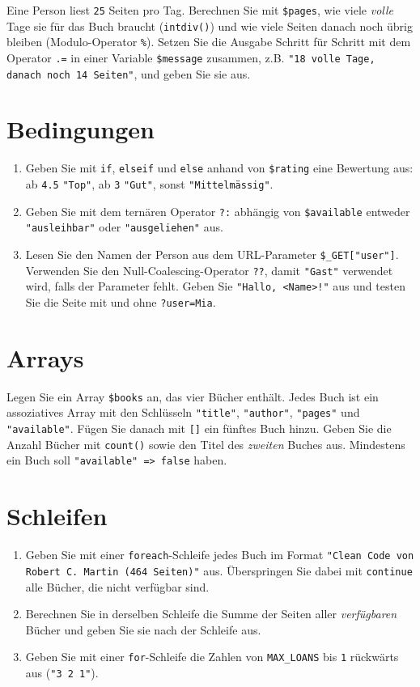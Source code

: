 \documentclass[a4paper,12pt]{article}
\begin{document}
Eine Person liest \texttt{25} Seiten pro Tag. Berechnen Sie mit \texttt{\$pages}, wie viele \emph{volle} Tage sie für das Buch braucht (\texttt{intdiv()}) und wie viele Seiten danach noch übrig bleiben (Modulo-Operator \texttt{\%}). Setzen Sie die Ausgabe Schritt für Schritt mit dem Operator \texttt{.=} in einer Variable \texttt{\$message} zusammen, z.B. \texttt{"{}18 volle Tage, danach noch 14 Seiten"{}}, und geben Sie sie aus.

\section{Bedingungen}

\begin{enumerate}
    \item Geben Sie mit \texttt{if}, \texttt{elseif} und \texttt{else} anhand von \texttt{\$rating} eine Bewertung aus: ab \texttt{4.5} \texttt{"{}Top"{}}, ab \texttt{3} \texttt{"{}Gut"{}}, sonst \texttt{"{}Mittelmässig"{}}.
    \item Geben Sie mit dem ternären Operator \texttt{?:} abhängig von \texttt{\$available} entweder \texttt{"{}ausleihbar"{}} oder \texttt{"{}ausgeliehen"{}} aus.
    \item Lesen Sie den Namen der Person aus dem URL-Parameter \texttt{\$\_GET["{}user"{}]}. Verwenden Sie den Null-Coalescing-Operator \texttt{??}, damit \texttt{"{}Gast"{}} verwendet wird, falls der Parameter fehlt. Geben Sie \texttt{"{}Hallo, <Name>!"{}} aus und testen Sie die Seite mit und ohne \texttt{?user=Mia}.
\end{enumerate}

\section{Arrays}

Legen Sie ein Array \texttt{\$books} an, das vier Bücher enthält. Jedes Buch ist ein assoziatives Array mit den Schlüsseln \texttt{"{}title"{}}, \texttt{"{}author"{}}, \texttt{"{}pages"{}} und \texttt{"{}available"{}}. Fügen Sie danach mit \texttt{[]} ein fünftes Buch hinzu. Geben Sie die Anzahl Bücher mit \texttt{count()} sowie den Titel des \emph{zweiten} Buches aus. Mindestens ein Buch soll \texttt{"{}available"{} => false} haben.

\section{Schleifen}

\begin{enumerate}
    \item Geben Sie mit einer \texttt{foreach}-Schleife jedes Buch im Format \texttt{"{}Clean Code von Robert C. Martin (464 Seiten)"{}} aus. Überspringen Sie dabei mit \texttt{continue} alle Bücher, die nicht verfügbar sind.
    \item Berechnen Sie in derselben Schleife die Summe der Seiten aller \emph{verfügbaren} Bücher und geben Sie sie nach der Schleife aus.
    \item Geben Sie mit einer \texttt{for}-Schleife die Zahlen von \texttt{MAX\_LOANS} bis \texttt{1} rückwärts aus (\texttt{"{}3 2 1"{}}).
\end{enumerate}
\end{document}
